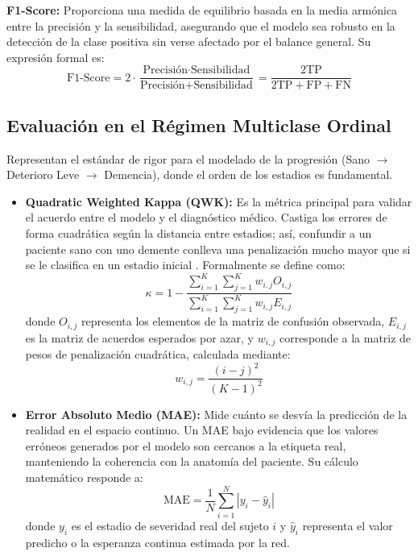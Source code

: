 \documentclass[12pt, oneside, english, spanish]{book}
\begin{document}
\textbf{F1-Score:} Proporciona una medida de equilibrio basada en la media armónica entre la precisión y la sensibilidad, asegurando que el modelo sea robusto en la detección de la clase positiva sin verse afectado por el balance general. Su expresión formal es:
\begin{equation}
	\text{F1-Score} = 2 \cdot \frac{\text{Precisión} \cdot \text{Sensibilidad}}{\text{Precisión} + \text{Sensibilidad}} = \frac{2\text{TP}}{2\text{TP} + \text{FP} + \text{FN}}
\end{equation}


\subsection{Evaluación en el Régimen Multiclase Ordinal} \label{subsec:metricas_ordinal}
Representan el estándar de rigor para el modelado de la progresión (Sano $\rightarrow$ Deterioro Leve $\rightarrow$ Demencia), donde el orden de los estadios es fundamental.

\begin{itemize}
	\item \textbf{Quadratic Weighted Kappa (QWK):} Es la métrica principal para validar el acuerdo entre el modelo y el diagnóstico médico. Castiga los errores de forma cuadrática según la distancia entre estadios; así, confundir a un paciente sano con uno demente conlleva una penalización mucho mayor que si se le clasifica en un estadio inicial \cite{beckham2017simple}. Formalmente se define como:
	\begin{equation}
		\kappa = 1 - \frac{\sum_{i=1}^{K} \sum_{j=1}^{K} w_{i,j} O_{i,j}}{\sum_{i=1}^{K} \sum_{j=1}^{K} w_{i,j} E_{i,j}}
	\end{equation}
	donde $O_{i,j}$ representa los elementos de la matriz de confusión observada, $E_{i,j}$ es la matriz de acuerdos esperados por azar, y $w_{i,j}$ corresponde a la matriz de pesos de penalización cuadrática, calculada mediante:
	\begin{equation}
		w_{i,j} = \frac{(i - j)^2}{(K - 1)^2}
	\end{equation}
	
	\item \textbf{Error Absoluto Medio (MAE):} Mide cuánto se desvía la predicción de la realidad en el espacio continuo. Un MAE bajo evidencia que los valores erróneos generados por el modelo son cercanos a la etiqueta real, manteniendo la coherencia con la anatomía del paciente. Su cálculo matemático responde a:
	\begin{equation}
		\text{MAE} = \frac{1}{N} \sum_{i=1}^{N} |y_i - \hat{y}_i|
	\end{equation}
	donde $y_i$ es el estadio de severidad real del sujeto $i$ y $\hat{y}_i$ representa el valor predicho o la esperanza continua estimada por la red.
\end{itemize}
\end{document}
